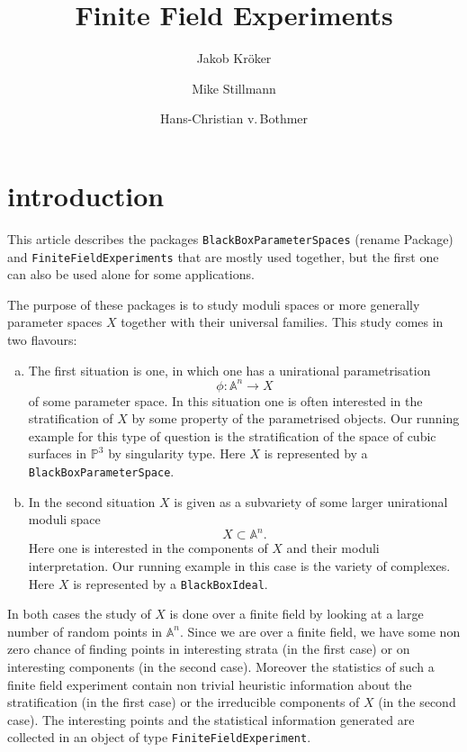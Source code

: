 \documentclass[12pt,a4paper]{amsart}
\theoremstyle{plain}
\theoremstyle{definition}
\renewcommand{\AA}{\mathbb A}
\newcommand{\PP}{\mathbb P}
\begin{document}
\title{Finite Field Experiments}

\author{Jakob Kr\"oker}
\author{Mike Stillmann}
\author{Hans-Christian v.\,Bothmer}

\maketitle

\section{introduction}

This article describes the packages {\tt BlackBoxParameterSpaces} {\color{red} (rename Package)} and
 {\tt FiniteFieldExperiments} that are mostly used together, but the first one can also be used alone for some applications.

The purpose of these packages is to study moduli spaces or more generally parameter spaces $X$ together with their universal families. This study comes in two flavours:

\begin{enumerate}[(a)]
\item The first situation is one, in which one has a unirational parametrisation 
\[
	\phi \colon \AA^n \to X
\]
of some parameter space. In this situation one is often interested in the stratification of $X$ by some property of the parametrised objects. Our running example for this type of question is the stratification of the space of cubic surfaces in $\PP^3$ by singularity type. Here $X$ is represented by a {\tt BlackBoxParameterSpace}.

\item In the second situation $X$ is given as a subvariety of some larger unirational moduli space
\[
	X \subset \AA^n.
\]
Here one is interested in the components of $X$ and their moduli interpretation. Our running example in this case is the variety of complexes. Here $X$ is represented by a {\tt BlackBoxIdeal}.
\end{enumerate}

In both cases the study of $X$ is done over a finite field by looking at a large number of random points in $\AA^n$. Since we are over a finite field, we have some non zero chance of finding points in interesting strata (in the first case) or on interesting components (in the second case). Moreover the statistics of such a finite field experiment contain non trivial heuristic information about the stratification (in the first case) or the irreducible components of $X$ (in the second case). The interesting points and the statistical information generated are collected in an object of type {\tt FiniteFieldExperiment}.
\end{document}
